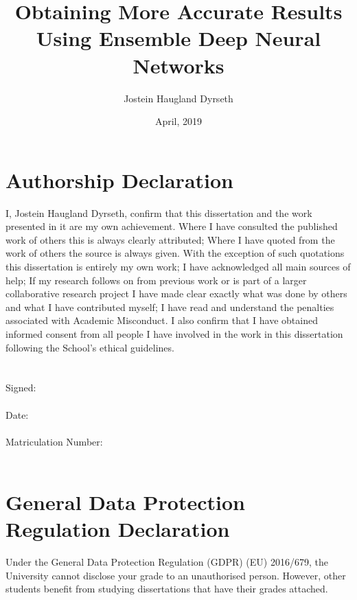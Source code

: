 \documentclass[
a4paper,
11pt,
english
]{report}
\title{Obtaining More Accurate Results \\
    Using Ensemble Deep Neural Networks}
\author{Jostein Haugland Dyrseth}
\date{April, 2019}
\begin{document}
\maketitle


\section{Authorship Declaration}
\addchaptertocentry{\authorshipname} %
\noindent I, Jostein Haugland Dyrseth, confirm that this dissertation and the work presented in it are my own achievement. Where I have consulted the published work of others this is always clearly attributed; Where I have quoted from the work of others the source is always given. With the exception of such quotations this dissertation is entirely my own work; I have acknowledged all main sources of help; If my research follows on from previous work or is part of a larger collaborative research project I have made clear exactly what was done by others and what I have contributed myself; I have read and understand the penalties associated with Academic Misconduct. I also confirm that I have obtained informed consent from all people I have involved in the work in this dissertation following the School's ethical guidelines.\\ \\ \\

\noindent Signed:\\
\\
\noindent Date:\\
\\
\noindent Matriculation Number:\\
\\
\clearpage


\section{General Data Protection Regulation Declaration}
Under the General Data Protection Regulation (GDPR) (EU) 2016/679, the University cannot disclose your grade to an unauthorised person. However, other students benefit from studying dissertations that have their grades attached.\\
\end{document}
